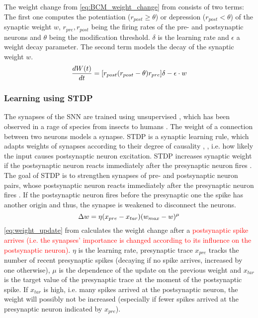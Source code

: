 The weight change from \autoref{eq:BCM_weight_change} from \cite{simulation_STDP} consists of two terms:
The first one computes the potentiation ($r_{post} \ge \theta$) or depression ($r_{post} < \theta$) of the synaptic weight $w$, 
$r_{pre}, r_{post}$ being the firing rates of the pre- and postsynaptic neurons and $\theta$ being the modification threshold.
$\delta$ is the learning rate and $\epsilon$ a weight decay parameter.
The second term models the decay of the synaptic weight $w$.
%
\begin{equation}
    \centering
    \label{eq:BCM_weight_change}
    \frac{dW(t)}{dt} = [r_{post}(r_{post} - \theta)r_{pre}]\delta - \epsilon \cdot w
\end{equation}


\subsubsection{Learning using \ac{STDP}}
The synapses of the \ac{SNN} are trained using unsupervised , which has been observed in a rage of species from insects to humans \cite{STDP_hebbian}. 
The weight of a connection between two neurons models a synapse.
\ac{STDP} is a synaptic learning rule, which adapts weights of synapses according to their degree of causality \cite{STDP_like}, \cite{multi_scale_STDP},
 i.e. how likely the input causes postsynaptic neuron excitation.
\ac{STDP} increases synaptic weight if the postsynaptic neuron reacts immediately after the presynaptic neuron fires \cite{object_detection_SNN}.
The goal of \ac{STDP} is to strengthen synapses of pre- and postsynaptic neuron pairs, 
whose postsynaptic neuron reacts immediately after the presynaptic neuron fires \cite{object_detection_SNN}.
If the postsynaptic neuron fires before the presynaptic one the spike has another origin and thus, the synapse is weakened to disconnect the neurons.
%
\begin{equation}
    \centering
    \label{eq:weight_update}
    \Delta w = \eta (x_{pre} - x_{tar})(w_{max}-w)^\mu
\end{equation}
%
\autoref{eq:weight_update} from \cite{SNN} calculates the weight change after a \textcolor{red}{postsynaptic spike arrives 
(i.e. the synapses' importance is changed according to its influence on the postsynaptic neuron)}.
$\eta$ is the learning rate, presynaptic trace $x_{pre}$ tracks the number of recent presynaptic spikes 
(decaying if no spike arrives, increased by one otherwise), 
$\mu$ is the dependence of the update on the previous weight and 
$x_{tar}$ is the target value of the presynaptic trace at the moment of the postsynaptic spike.
If $x_{tar}$ is high, i.e. many spikes arrived at the postsynaptic neuron, the weight will possibly not be increased 
(especially if fewer spikes arrived at the presynaptic neuron indicated by  $x_{pre}$).

